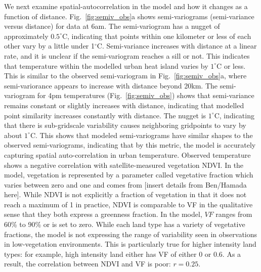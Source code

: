 We next examine spatial-autocorrelation in the model and how it changes as a function of distance. Fig.~\ref{fig:semiv_obs}a shows semi-variograms (semi-variance versus distance) for data at 6am. The semi-variogram has a nugget of approximately $0.5^\circ$C, indicating that points within one kilometer or less of each other vary by a little under 1$^\circ$C. Semi-variance increases with distance at a linear rate, and it is unclear if the semi-variogram reaches a sill or not. This indicates that temperature within the modelled urban heat island varies by $1^\circ$C or less. This is similar to the observed semi-variogram in Fig.~\ref{fig:semiv_obs}a, where semi-variorance appears to increase with distance beyond 20km. The semi-variogram for 4pm temperatures (Fig.~\ref{fig:semiv_obs}) shows that semi-variance remains constant or slightly increases with distance, indicating that modelled point similarity increases constantly with distance. The nugget is $1^\circ$C, indicating that there is sub-gridscale variability causes neighboring gridpoints to vary by about $1^\circ$C. 
This shows that modeled semi-variograms have similar shapes to the observed semi-variograms, indicating that by this metric, the model is accurately capturing spatial auto-correlation in urban temperature. %
Observed temperature shows a negative correlation with satellite-measured vegetation NDVI. In the model, vegetation is represented by a parameter called vegetative fraction which varies between zero and one and comes from [insert details from Ben/Hamada here]. 
While NDVI is not explicitly a fraction of vegetation in that it does not reach a maximum of 1 in practice, NDVI is comparable to VF in the qualitative sense that they both express a greenness fraction. In the model, $VF$ ranges from 60\% to 90\% or is set to zero. While each land type has a variety of vegetative fractions, the model is not expressing the range of variability seen in observations in low-vegetation environments. This is particularly true for higher intensity land types: for example, high intensity land either has VF of either 0 or 0.6. As a result, the correlation between NDVI and VF is poor: $r=0.25$. 
